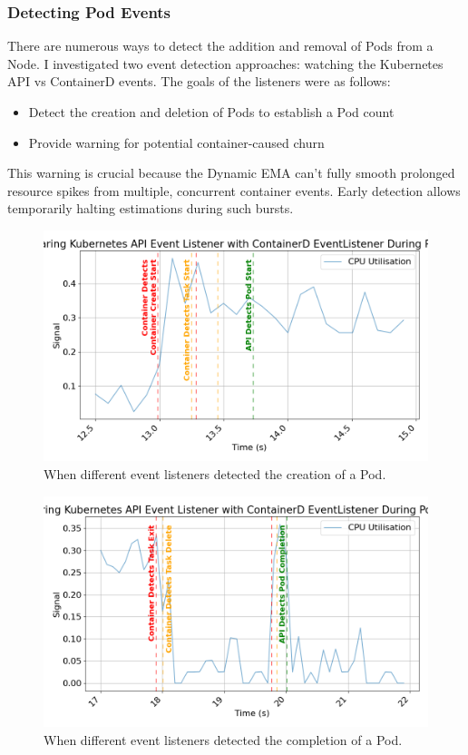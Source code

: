 \subsubsection{Detecting Pod Events}
\label{sec:listeners-comparison}
There are numerous ways to detect the addition and removal of Pods from a Node.
I investigated two event detection approaches: watching the Kubernetes API vs
ContainerD events. The goals of the listeners were as follows:
\begin{itemize}
    \item Detect the creation and deletion of Pods to establish a Pod count
    \item Provide warning for potential container-caused churn
\end{itemize}
This warning is crucial because the Dynamic EMA can't fully smooth prolonged
resource spikes from multiple, concurrent container events. Early detection
allows temporarily halting estimations during such bursts.
\begin{figure}[H]
    \centering
    \includegraphics[width=\textwidth]{images/event-comparison-start.png}
    \caption{When different event listeners detected the creation of a Pod.}
    \label{fig:event-evaluation-start}
\end{figure}

\begin{figure}[H]
    \centering
    \includegraphics[width=\textwidth]{images/event-comparison-end.png}
    \caption{When different event listeners detected the completion of a Pod.}
    \label{fig:event-evaluation-end}
\end{figure}

